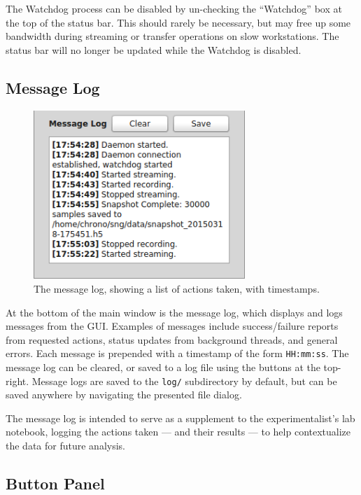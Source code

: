 The Watchdog process can be disabled by un-checking the ``Watchdog'' box at the top of the status bar. This should rarely be necessary, but may free up some bandwidth during streaming or transfer operations on slow workstations. The status bar will no longer be updated while the Watchdog is disabled.


\subsection{Message Log}
\label{sec_usage_messagelog}

\begin{figure}[h!]
\begin{center}
\includegraphics[width=8cm]{screenshots/msgLog.png}
\end{center}
\caption{The message log, showing a list of actions taken, with timestamps.}
\label{fig_statusbar}
\end{figure}

At the bottom of the main window is the message log, which displays and logs messages from the GUI. Examples of messages include success/failure reports from requested actions, status updates from background threads, and general errors. Each message is prepended with a timestamp of the form \texttt{HH:mm:ss}. The message log can be cleared, or saved to a log file using the buttons at the top-right. Message logs are saved to the \texttt{log/} subdirectory by default, but can be saved anywhere by navigating the presented file dialog.

The message log is intended to serve as a supplement to the experimentalist's lab notebook, logging the actions taken --- and their results --- to help contextualize the data for future analysis.


\subsection{Button Panel}
\label{sec_usage_buttonpanel}

